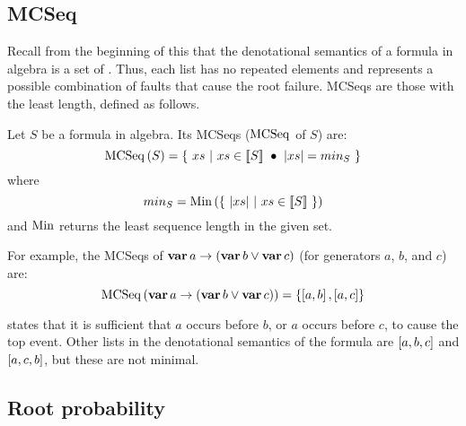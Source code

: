 \subsection[Minimal cut sequence]{\Acl{MCSeq}}

Recall from the beginning of this  that the denotational semantics of a formula in \ac{algebra} is a set of \distinctlists.
Thus, each list has no repeated elements and represents a possible combination of faults that cause the root failure.
\Acp{MCSeq} are those \distinctlists with the least length, defined as follows.

\begin{definition}
Let $S$ be a formula in \ac{algebra}.
Its \aclp{MCSeq} ($\operatorname{\mathrm{MCSeq}}$ of $S$) are:
%
\begin{equation}
\operatorname{\mathrm{MCSeq}}\left(S\right) = \left\{~ xs ~\middle|~ xs \in \left[\!\left[S\right]\!\right] ~\bullet~ \left|xs\right| = min_S ~\right\}
\end{equation}
%
where
\[
min_S = \mathrm{Min}\left(\left\{~ \left|xs\right| ~\middle|~ xs \in \left[\!\left[S\right]\!\right] ~\right\}\right)
\]
%
and $\mathrm{Min}$ returns the least sequence length in the given set.
\end{definition}

For example, the \acp{MCSeq} of $\operatorname{\mathbf{var}} a \rightarrow \left(\operatorname{\mathbf{var}} b \lor \operatorname{\mathbf{var}} c\right)$ (for generators $a$, $b$, and $c$) are:
%
\begin{equation}
\operatorname{\mathrm{MCSeq}}\left(\operatorname{\mathbf{var}} a \rightarrow \left(\operatorname{\mathbf{var}} b \lor \operatorname{\mathbf{var}} c\right)\right) = \left\{ \left[ a,b \right], \left[ a,c \right] \right\}\label{eq:mcseq-a-and-b}
\end{equation}

 states that it is sufficient that $a$ occurs before $b$, or $a$ occurs before $c$, to cause the top event.
Other lists in the denotational semantics of the formula are $\left[ a,b,c \right]$ and $\left[ a,c,b \right]$, but these are not minimal.

\subsection{Root probability}
\label{sec:root-probability}

